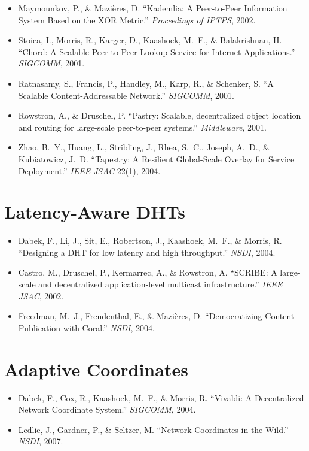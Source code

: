 \documentclass[twoside,nobib]{tufte-book}
\begin{document}
\begin{itemize}\setlength\itemsep{0.2em}
  \item Maymounkov, P., \& Mazi\`eres, D. ``Kademlia: A
    Peer-to-Peer Information System Based on the XOR Metric.''
    \emph{Proceedings of IPTPS}, 2002.
  \item Stoica, I., Morris, R., Karger, D., Kaashoek, M.~F., \&
    Balakrishnan, H. ``Chord: A Scalable Peer-to-Peer Lookup
    Service for Internet Applications.'' \emph{SIGCOMM},
    2001.
  \item Ratnasamy, S., Francis, P., Handley, M., Karp, R., \&
    Schenker, S. ``A Scalable Content-Addressable Network.''
    \emph{SIGCOMM}, 2001.
  \item Rowstron, A., \& Druschel, P. ``Pastry: Scalable,
    decentralized object location and routing for large-scale
    peer-to-peer systems.'' \emph{Middleware}, 2001.
  \item Zhao, B.~Y., Huang, L., Stribling, J., Rhea, S.~C.,
    Joseph, A.~D., \& Kubiatowicz, J.~D. ``Tapestry: A Resilient
    Global-Scale Overlay for Service Deployment.''
    \emph{IEEE JSAC} 22(1), 2004.
\end{itemize}

\section*{Latency-Aware DHTs}

\begin{itemize}\setlength\itemsep{0.2em}
  \item Dabek, F., Li, J., Sit, E., Robertson, J., Kaashoek,
    M.~F., \& Morris, R. ``Designing a DHT for low latency and
    high throughput.'' \emph{NSDI}, 2004.
  \item Castro, M., Druschel, P., Kermarrec, A., \& Rowstron, A.
    ``SCRIBE: A large-scale and decentralized
    application-level multicast infrastructure.''
    \emph{IEEE JSAC}, 2002.
  \item Freedman, M.~J., Freudenthal, E., \& Mazi\`eres, D.
    ``Democratizing Content Publication with Coral.''
    \emph{NSDI}, 2004.
\end{itemize}

\section*{Adaptive Coordinates}

\begin{itemize}\setlength\itemsep{0.2em}
  \item Dabek, F., Cox, R., Kaashoek, M.~F., \& Morris, R.
    ``Vivaldi: A Decentralized Network Coordinate System.''
    \emph{SIGCOMM}, 2004.
  \item Ledlie, J., Gardner, P., \& Seltzer, M. ``Network
    Coordinates in the Wild.'' \emph{NSDI}, 2007.
\end{itemize}
\end{document}
